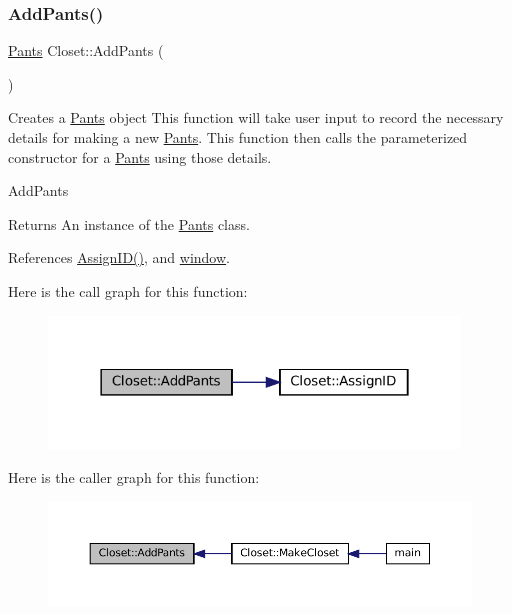 \subsubsection{\texorpdfstring{Add\+Pants()}{AddPants()}}
{\footnotesize\ttfamily \mbox{\hyperlink{classPants}{Pants}} Closet\+::\+Add\+Pants (\begin{DoxyParamCaption}{ }\end{DoxyParamCaption})\hspace{0.3cm}{\ttfamily [private]}}



Creates a \textquotesingle{}\mbox{\hyperlink{classPants}{Pants}}\textquotesingle{} object  This function will take user input to record the necessary details for making a new \textquotesingle{}\mbox{\hyperlink{classPants}{Pants}}\textquotesingle{}. This function then calls the parameterized constructor for a \textquotesingle{}\mbox{\hyperlink{classPants}{Pants}}\textquotesingle{} using those details. 

Add\+Pants \begin{DoxyReturn}{Returns}
An instance of the \textquotesingle{}\mbox{\hyperlink{classPants}{Pants}}\textquotesingle{} class. 
\end{DoxyReturn}


References \mbox{\hyperlink{classCloset_afabc27d621abdf0089a6b3027ea8f470}{Assign\+I\+D()}}, and \mbox{\hyperlink{classCloset_af1eb4f786cc4eccd3018b90632236a93}{window}}.

Here is the call graph for this function\+:
\nopagebreak
\begin{figure}[H]
\begin{center}
\leavevmode
\includegraphics[width=310pt]{classCloset_a86001d9aab63ec5cca05bb2daa67e755_cgraph}
\end{center}
\end{figure}
Here is the caller graph for this function\+:
\nopagebreak
\begin{figure}[H]
\begin{center}
\leavevmode
\includegraphics[width=350pt]{classCloset_a86001d9aab63ec5cca05bb2daa67e755_icgraph}
\end{center}
\end{figure}
\mbox{\label{classCloset_aba3296cf8964b43f64911cc69c56cbfd}} 
